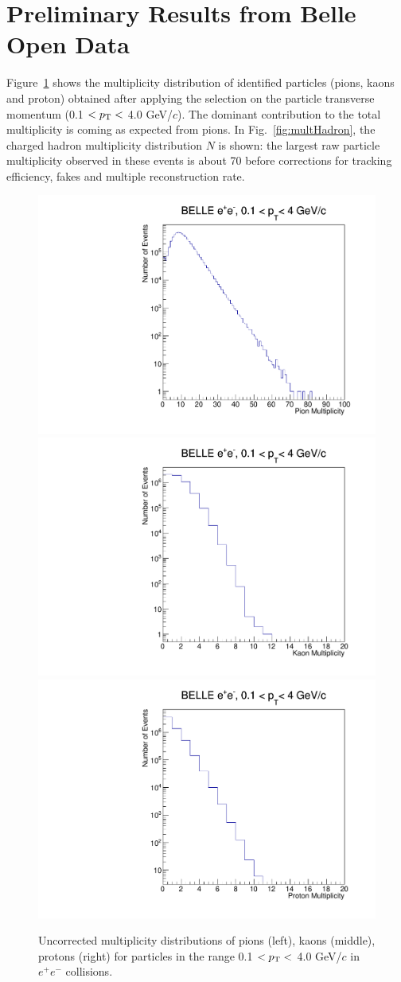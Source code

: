 \section{Preliminary Results from Belle Open Data}

Figure~\ref{fig:multPID} shows the multiplicity distribution of identified particles (pions, kaons and proton) obtained after 
applying the selection on the particle transverse momentum (0.1 $<p_{\rm T}<$ 4.0 GeV/$c$). 
The dominant contribution to the total multiplicity is coming as expected from pions.
In Fig.~\ref{fig:multHadron}, the charged hadron multiplicity distribution $N$ is shown: the largest raw particle multiplicity observed in these events is about 70 before corrections for tracking efficiency, fakes and multiple reconstruction rate. 

\begin{figure}[!htb]
\begin{center}
\includegraphics[width=.32\textwidth]{figures/pion_mult.pdf}
\includegraphics[width=.32\textwidth]{figures/kaon_mult.pdf}
\includegraphics[width=.32\textwidth]{figures/proton_mult.pdf}
\caption{Uncorrected multiplicity distributions of pions (left), kaons (middle), protons (right) for  particles in the range  0.1 $<p_{\rm T}<$ 4.0 GeV/$c$ in $e^{+}e^{-}$ collisions. }
\label{fig:multPID} 
\end{center}
\end{figure}

